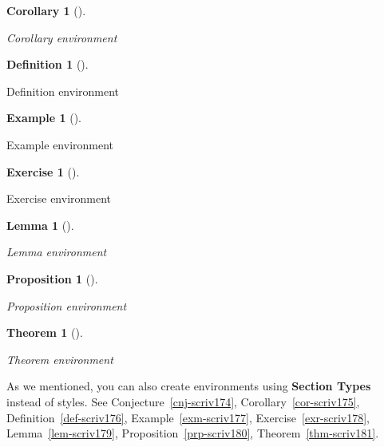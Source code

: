 \documentclass[
  12pt,
  a4paper,
  numbers=noenddot,
  titlepage,
  toclink=all,
  toc=bibliography]{scrbook}
\theoremstyle{definition}
\newtheorem{example}{Example}[section]
\theoremstyle{definition}
\newtheorem{definition}{Definition}[section]
\theoremstyle{definition}
\newtheorem{exercise}{Exercise}[section]
\theoremstyle{plain}
\newtheorem{theorem}{Theorem}[section]
\theoremstyle{plain}
\newtheorem{corollary}{Corollary}[section]
\theoremstyle{plain}
\theoremstyle{plain}
\newtheorem{proposition}{Proposition}[section]
\theoremstyle{plain}
\newtheorem{lemma}{Lemma}[section]
\theoremstyle{remark}
\begin{document}
\begin{corollary}[]\protect\hypertarget{cor-scriv173}{}\label{cor-scriv173}

Corollary environment

\end{corollary}

\begin{definition}[]\protect\hypertarget{def-scriv173}{}\label{def-scriv173}

Definition environment

\end{definition}

\begin{example}[]\protect\hypertarget{exm-scriv173}{}\label{exm-scriv173}

Example environment

\end{example}

\begin{exercise}[]\protect\hypertarget{exr-scriv173}{}\label{exr-scriv173}

Exercise environment

\end{exercise}

\begin{lemma}[]\protect\hypertarget{lem-scriv173}{}\label{lem-scriv173}

Lemma environment

\end{lemma}

\begin{proposition}[]\protect\hypertarget{prp-scriv173}{}\label{prp-scriv173}

Proposition environment

\end{proposition}

\begin{theorem}[]\protect\hypertarget{thm-scriv173}{}\label{thm-scriv173}

Theorem environment

\end{theorem}

As we mentioned, you can also create environments using \textbf{Section
Types} instead of styles. See
\protect\hypertarget{cite_45}{}{\label{cite_45}Conjecture~\ref{cnj-scriv174}},
\protect\hypertarget{cite_46}{}{\label{cite_46}Corollary~\ref{cor-scriv175}},
\protect\hypertarget{cite_47}{}{\label{cite_47}Definition~\ref{def-scriv176}},
\protect\hypertarget{cite_48}{}{\label{cite_48}Example~\ref{exm-scriv177}},
\protect\hypertarget{cite_49}{}{\label{cite_49}Exercise~\ref{exr-scriv178}},
\protect\hypertarget{cite_50}{}{\label{cite_50}Lemma~\ref{lem-scriv179}},
\protect\hypertarget{cite_51}{}{\label{cite_51}Proposition~\ref{prp-scriv180}},
\protect\hypertarget{cite_52}{}{\label{cite_52}Theorem~\ref{thm-scriv181}}.
\end{document}
